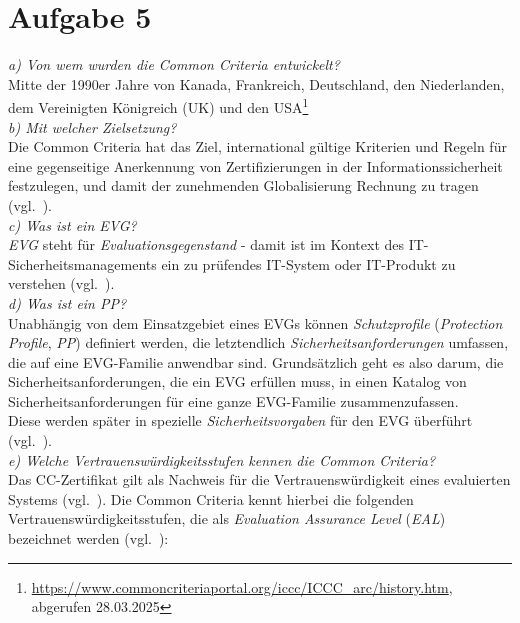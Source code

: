 \chapter{Aufgabe 5}

\textit{a) Von wem wurden die Common Criteria entwickelt?}\\

Mitte der 1990er Jahre von Kanada, Frankreich, Deutschland, den Niederlanden, dem Vereinigten Königreich (UK) und den USA\footnote{
\url{https://www.commoncriteriaportal.org/iccc/ICCC_arc/history.htm}, abgerufen 28.03.2025
}\\

\noindent
\textit{b) Mit welcher Zielsetzung?}\\

Die Common Criteria hat das Ziel, international gültige Kriterien und Regeln für eine gegenseitige Anerkennung von Zertifizierungen in der Informationssicherheit  festzulegen, und damit der zunehmenden Globalisierung Rechnung zu tragen (vgl.~\cite[85]{ITS2}).\\

\noindent
\textit{c) Was ist ein EVG?}\\

\textit{EVG} steht für \textit{Evaluationsgegenstand} - damit ist im Kontext des IT-Sicherheitsmanagements ein zu prüfendes IT-System oder IT-Produkt zu verstehen (vgl.~\cite[86]{ITS2}).\\


\noindent
\textit{d) Was ist ein PP?}\\

Unabhängig von dem Einsatzgebiet eines EVGs können \textit{Schutzprofile} (\textit{Protection Profile}, \textit{PP}) definiert werden, die letztendlich \textit{Sicherheitsanforderungen} umfassen, die auf eine EVG-Familie anwendbar sind.
Grundsätzlich geht es also darum, die Sicherheitsanforderungen, die ein EVG erfüllen muss, in einen Katalog von Sicherheitsanforderungen für eine ganze EVG-Familie zusammenzufassen.\\
Diese werden später in spezielle \textit{Sicherheitsvorgaben} für den EVG überführt (vgl.~\cite[219 f.]{Eck18}).\\

\noindent
\textit{e) Welche Vertrauenswürdigkeitsstufen kennen die Common Criteria?}\\

Das CC-Zertifikat gilt als Nachweis für die Vertrauenswürdigkeit eines evaluierten Systems (vgl.~\cite[219]{Eck18}).
Die Common Criteria kennt hierbei die folgenden Vertrauenswürdigkeitsstufen, die als \textit{Evaluation Assurance Level} (\textit{EAL}) bezeichnet werden (vgl.~\cite[94 f.]{ITS2}):

